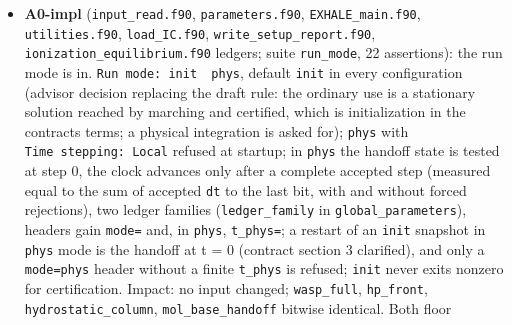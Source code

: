 \documentclass[english,a4paper]{my_memo}
\begin{document}
\begin{itemize}
  physical terms, or when the arithmetic forbids the second (residual at
  \texttt{64\ epsilon} of the full terms), a named outcome; the interim reason
  \texttt{unreachable\_at\_substep} for a refusal whose rows are all at round-off was
  superseded the same day by A1scale3 (below); the stop message reports the
  halvings made.
  Option (a) (stopping on the physical scale alone) was built, measured
  (one extra iteration every step, no rescue of the short substep) and
  declined. Correction of the A1scale report: the Newton reached one
  epsilon in two iterations on that column; the 7.7e-5 was the ninth
  attempt\textquotesingle s state. Impact: \texttt{mol\_carrier}, \texttt{mol\_base\_handoff} identical;
  \texttt{oxygen\_chemistry} still refused after step 2 (now the unreachable reason,
  OH at cell 90, 15 attempts). Decision taken from its finding (A1scale3,
  started): a row at the arithmetic round-off of its own terms is not
  evidence of a defect and is accepted as "round-off limited" with a flag
  and a count, so a trace carrier at the element floor does not refuse an
  interval; the physical-terms acceptance stays for every other row.
\item
  \textbf{A0-impl} (\texttt{input\_read.f90}, \texttt{parameters.f90}, \texttt{EXHALE\_main.f90},
  \texttt{utilities.f90}, \texttt{load\_IC.f90}, \texttt{write\_setup\_report.f90},
  \texttt{ionization\_equilibrium.f90} ledgers; suite \texttt{run\_mode}, 22 assertions):
  the run mode is in. \texttt{Run\ mode:\ init\ \textbar{}\ phys}, default \texttt{init} in every
  configuration (advisor decision replacing the draft rule: the ordinary
  use is a stationary solution reached by marching and certified, which is
  initialization in the contract\textquotesingle s terms; a physical integration is asked
  for); \texttt{phys} with \texttt{Time\ stepping:\ Local} refused at startup; in \texttt{phys} the
  handoff state is tested at step 0, the clock advances only after a
  complete accepted step (measured equal to the sum of accepted \texttt{dt} to the
  last bit, with and without forced rejections), two ledger families
  (\texttt{ledger\_family} in \texttt{global\_parameters}), headers gain \texttt{mode=} and, in
  \texttt{phys}, \texttt{t\_phys=}; a restart of an \texttt{init} snapshot in \texttt{phys} mode is the
  handoff at t = 0 (contract section 3 clarified), and only a \texttt{mode=phys}
  header without a finite \texttt{t\_phys} is refused; \texttt{init} never exits nonzero
  for certification. Impact: no input changed; \texttt{wasp\_full}, \texttt{hp\_front},
  \texttt{hydrostatic\_column}, \texttt{mol\_base\_handoff} bitwise identical. Both floor

\end{itemize}
\end{document}
